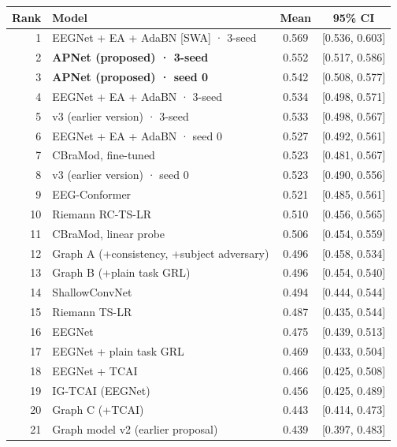 \begin{tabular}{rlcc}
\hline
Rank & Model & Mean & 95\% CI \\
\hline
1 & EEGNet + EA + AdaBN [SWA] · 3-seed & 0.569 & [0.536, 0.603] \\
2 & \textbf{APNet (proposed) · 3-seed} & 0.552 & [0.517, 0.586] \\
3 & \textbf{APNet (proposed) · seed 0} & 0.542 & [0.508, 0.577] \\
4 & EEGNet + EA + AdaBN · 3-seed & 0.534 & [0.498, 0.571] \\
5 & v3 (earlier version) · 3-seed & 0.533 & [0.498, 0.567] \\
6 & EEGNet + EA + AdaBN · seed 0 & 0.527 & [0.492, 0.561] \\
7 & CBraMod, fine-tuned & 0.523 & [0.481, 0.567] \\
8 & v3 (earlier version) · seed 0 & 0.523 & [0.490, 0.556] \\
9 & EEG-Conformer & 0.521 & [0.485, 0.561] \\
10 & Riemann RC-TS-LR & 0.510 & [0.456, 0.565] \\
11 & CBraMod, linear probe & 0.506 & [0.454, 0.559] \\
12 & Graph A (+consistency, +subject adversary) & 0.496 & [0.458, 0.534] \\
13 & Graph B (+plain task GRL) & 0.496 & [0.454, 0.540] \\
14 & ShallowConvNet & 0.494 & [0.444, 0.544] \\
15 & Riemann TS-LR & 0.487 & [0.435, 0.544] \\
16 & EEGNet & 0.475 & [0.439, 0.513] \\
17 & EEGNet + plain task GRL & 0.469 & [0.433, 0.504] \\
18 & EEGNet + TCAI & 0.466 & [0.425, 0.508] \\
19 & IG-TCAI (EEGNet) & 0.456 & [0.425, 0.489] \\
20 & Graph C (+TCAI) & 0.443 & [0.414, 0.473] \\
21 & Graph model v2 (earlier proposal) & 0.439 & [0.397, 0.483] \\
\hline
\end{tabular}